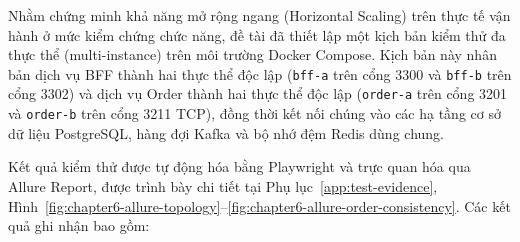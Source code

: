 Nhằm chứng minh khả năng mở rộng ngang (Horizontal Scaling) trên thực tế vận hành ở mức kiểm chứng chức năng, đề tài đã thiết lập một kịch bản kiểm thử đa thực thể (multi-instance) trên môi trường Docker Compose. Kịch bản này nhân bản dịch vụ BFF thành hai thực thể độc lập (\texttt{bff-a} trên cổng 3300 và \texttt{bff-b} trên cổng 3302) và dịch vụ Order thành hai thực thể độc lập (\texttt{order-a} trên cổng 3201 và \texttt{order-b} trên cổng 3211 TCP), đồng thời kết nối chúng vào các hạ tầng cơ sở dữ liệu PostgreSQL, hàng đợi Kafka và bộ nhớ đệm Redis dùng chung. 

Kết quả kiểm thử được tự động hóa bằng Playwright và trực quan hóa qua Allure Report, được trình bày chi tiết tại Phụ lục~\ref{app:test-evidence}, Hình~\ref{fig:chapter6-allure-topology}--\ref{fig:chapter6-allure-order-consistency}. Các kết quả ghi nhận bao gồm:
